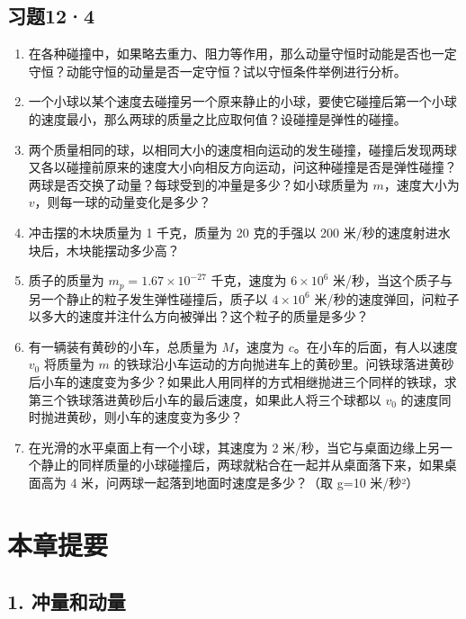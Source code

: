 \subsection{习题12·4}\label{ux4e60ux9898124}

\begin{enumerate}
\def\labelenumi{\arabic{enumi}.}
\item
  在各种碰撞中，如果略去重力、阻力等作用，那么动量守恒时动能是否也一定守恒？动能守恒的动量是否一定守恒？试以守恒条件举例进行分析。
\item
  一个小球以某个速度去碰撞另一个原来静止的小球，要使它碰撞后第一个小球的速度最小，那么两球的质量之比应取何值？设碰撞是弹性的碰撞。
\item
  两个质量相同的球，以相同大小的速度相向运动的发生碰撞，碰撞后发现两球又各以碰撞前原来的速度大小向相反方向运动，问这种碰撞是否是弹性碰撞？两球是否交换了动量？每球受到的冲量是多少？如小球质量为
  \(m\)，速度大小为 \(v\)，则每一球的动量变化是多少？
\item
  冲击摆的木块质量为 1 千克，质量为 20 克的手强以 200
  米/秒的速度射进水块后，木块能摆动多少高？
\item
  质子的质量为 \(m_p = 1.67 \times 10^{-27}\) 千克，速度为
  \(6 \times 10^6\)
  米/秒，当这个质子与另一个静止的粒子发生弹性碰撞后，质子以
  \(4 \times 10^6\)
  米/秒的速度弹回，问粒子以多大的速度并注什么方向被弹出？这个粒子的质量是多少？
\item
  有一辆装有黄砂的小车，总质量为 \(M\)，速度为
  \(c\)。在小车的后面，有人以速度 \(v_0\) 将质量为 \(m\)
  的铁球沿小车运动的方向抛进车上的黄砂里。问铁球落进黄砂后小车的速度变为多少？如果此人用同样的方式相继抛进三个同样的铁球，求第三个铁球落进黄砂后小车的最后速度，如果此人将三个球都以
  \(v_0\) 的速度同时抛进黄砂，则小车的速度变为多少？
\item
  在光滑的水平桌面上有一个小球，其速度为 2
  米/秒，当它与桌面边缘上另一个静止的同样质量的小球碰撞后，两球就粘合在一起并从桌面落下来，如果桌面高为
  4 米，问两球一起落到地面时速度是多少？（取 g=10 米/秒²）
\end{enumerate}

\section{本章提要}\label{ux672cux7ae0ux63d0ux8981-11}

\subsection{1. 冲量和动量}\label{ux51b2ux91cfux548cux52a8ux91cf}

